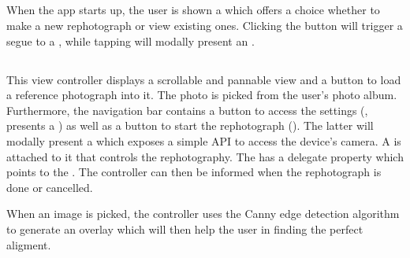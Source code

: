 \subsection{}

When the app starts up, the user is shown a  which
offers a choice whether to make a new rephotograph or view existing ones.
Clicking the  button will trigger a segue to a
, while tapping  will modally
present an .


\subsection{}

\setlength\emergencystretch{2em}
This view controller displays a scrollable and pannable view and a button
 to load a reference photograph into it. The
photo is picked from the user's photo album.  Furthermore, the navigation bar
contains a button to access the settings
(, presents a
) as well as a button to start the rephotograph
(). The latter
will modally present a  which exposes a simple API
to access the device's camera. A
 is attached to it that controls the rephotography. The
 has a delegate property which points to the
. The controller can then be informed when the
rephotograph is done or cancelled.


When an image is picked, the controller uses the Canny edge detection algorithm
\citep{canny1986} to generate an overlay which will then help the user in
finding the perfect aligment.


